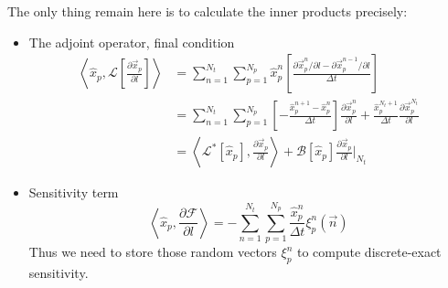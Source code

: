 \documentclass[11pt]{article}
\def\Dpartial#1#2{ \frac{\partial #1}{\partial #2} }
\newcommand{\vn}{\vec{n}}
\newcommand{\xp}{\vec{x}_p}
\newcommand{\Dt}{\Delta t}
\newcommand{\xph}{\hat{x}_p}
\newcommand{\inprod}[2]{\left\langle#1,#2\right\rangle}
\newcommand{\cL}{\mathcal{L}}
\newcommand{\cF}{\mathcal{F}}
\newcommand{\cB}{\mathcal{B}}
\begin{document}
The only thing remain here is to calculate the inner products precisely:
\begin{itemize}
\item The adjoint operator, final condition
\begin{equation*}
\begin{split}
\inprod{\xph}{\cL\left[\Dpartial{\xp}{l}\right]} &= \sum_{n=1}^{N_t}\sum_{p=1}^{N_p}\xph^n\left[ \frac{\partial\xp^n/\partial l - \partial\xp^{n-1}/\partial l}{\Dt} \right]\\
&= \sum_{n=1}^{N_t}\sum_{p=1}^{N_p}\left[ -\frac{\xph^{n+1} - \xph^n}{\Dt} \right]\Dpartial{\xp^n}{l} + \frac{\xph^{N_t+1}}{\Dt}\Dpartial{\xp^{N_t}}{l}\\
&= \inprod{\cL^*[\xph]}{\Dpartial{\xp}{l}} + \cB[\xph]\Dpartial{\xp}{l}\bigg|_{N_t}
\end{split}
\end{equation*}
\item Sensitivity term
\begin{equation*}
\inprod{\xph}{\Dpartial{\cF}{l}} = - \sum_{n=1}^{N_t}\sum_{p=1}^{N_p}\frac{\xph^n}{\Dt}\xi_p^n(\vn)
\end{equation*}
Thus we need to store those random vectors $\xi_p^n$ to compute discrete-exact sensitivity.
\end{itemize}
\end{document}
